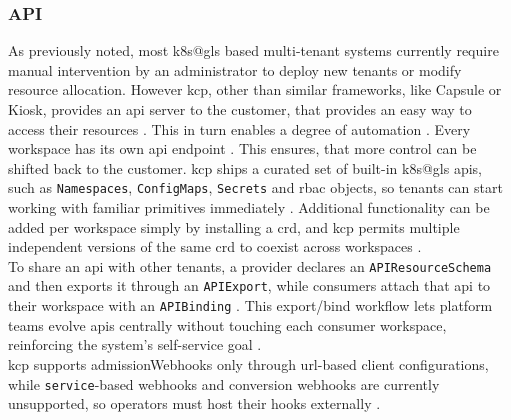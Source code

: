 \documentclass[11pt, a4paper, oneside, listof=totoc]{scrartcl}
\begin{document}
            \subsubsection{API}\label{subsubsec:api}
                As previously noted, most \gls{k8s@gls} based multi-tenant systems currently require
                manual intervention by an administrator to deploy new tenants or modify resource
                allocation.
                However \gls{kcp}, other than similar frameworks, like Capsule or Kiosk, provides an
                \gls{api} server to the customer, that provides an easy way to access
                their resources \parencites[p.~651]{nguyen2022}{kcpio}.
                This in turn enables a degree of automation \parencite[p.~651]{nguyen2022}.
                Every workspace has its own \gls{api} endpoint \parencite{kcpWorkspaces}.
                This ensures, that more control can be shifted back to the customer.
                \gls{kcp} ships a curated set of built-in \gls{k8s@gls} \glspl{api}, such as
                \texttt{Namespaces}, \texttt{ConfigMaps}, \texttt{Secrets} and \gls{rbac} objects, 
                so tenants can start working with familiar primitives immediately
                \parencite{kcpAPIsBuiltIn}.
                Additional functionality can be added per workspace simply by installing a
                \gls{crd}, and \gls{kcp} permits multiple independent versions of the same \gls{crd}
                to coexist across workspaces \parencite{kcpAPIs}.
                \\
                To share an \gls{api} with other tenants, a provider declares an
                \texttt{APIResourceSchema} and then exports it through an \texttt{APIExport},
                while consumers attach that \gls{api} to their workspace with an \texttt{APIBinding}
                \parencite{kcpAPIsExport}.
                This export/bind workflow lets platform teams evolve \glspl{api} centrally without
                touching each consumer workspace, reinforcing the system's self-service goal
                \parencite{kcpAPIsExport}.
                \\
                \gls{kcp} supports \glspl{admissionWebhook} only through \gls{url}-based client
                configurations, while \texttt{service}-based webhooks and conversion webhooks are
                currently unsupported, so operators must host their hooks externally
                \parencite{kcpAPIsAdmissionWebhooks}.
                \\
\end{document}
